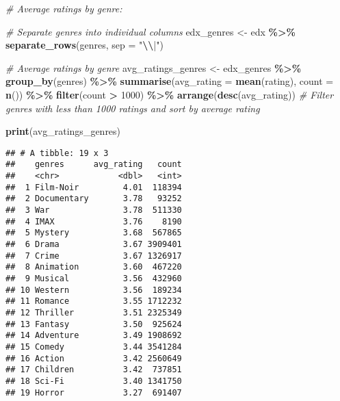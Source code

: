 \documentclass[
]{article}
\newenvironment{Shaded}{\begin{snugshade}}{\end{snugshade}}
\newcommand{\AttributeTok}[1]{\textcolor[rgb]{0.13,0.29,0.53}{#1}}
\newcommand{\CommentTok}[1]{\textcolor[rgb]{0.56,0.35,0.01}{\textit{#1}}}
\newcommand{\DecValTok}[1]{\textcolor[rgb]{0.00,0.00,0.81}{#1}}
\newcommand{\FunctionTok}[1]{\textcolor[rgb]{0.13,0.29,0.53}{\textbf{#1}}}
\newcommand{\NormalTok}[1]{#1}
\newcommand{\OtherTok}[1]{\textcolor[rgb]{0.56,0.35,0.01}{#1}}
\newcommand{\SpecialCharTok}[1]{\textcolor[rgb]{0.81,0.36,0.00}{\textbf{#1}}}
\newcommand{\StringTok}[1]{\textcolor[rgb]{0.31,0.60,0.02}{#1}}
\begin{document}
\begin{Shaded}
\begin{Highlighting}[]
\CommentTok{\# Average ratings by genre:}


\CommentTok{\# Separate genres into individual columns}
\NormalTok{edx\_genres }\OtherTok{\textless{}{-}}\NormalTok{ edx }\SpecialCharTok{\%\textgreater{}\%} \FunctionTok{separate\_rows}\NormalTok{(genres, }\AttributeTok{sep =} \StringTok{"}\SpecialCharTok{\textbackslash{}\textbackslash{}}\StringTok{|"}\NormalTok{)}

\CommentTok{\# Average ratings by genre}
\NormalTok{avg\_ratings\_genres }\OtherTok{\textless{}{-}}\NormalTok{ edx\_genres }\SpecialCharTok{\%\textgreater{}\%}
  \FunctionTok{group\_by}\NormalTok{(genres) }\SpecialCharTok{\%\textgreater{}\%}
  \FunctionTok{summarise}\NormalTok{(}\AttributeTok{avg\_rating =} \FunctionTok{mean}\NormalTok{(rating), }\AttributeTok{count =} \FunctionTok{n}\NormalTok{()) }\SpecialCharTok{\%\textgreater{}\%}
  \FunctionTok{filter}\NormalTok{(count }\SpecialCharTok{\textgreater{}} \DecValTok{1000}\NormalTok{) }\SpecialCharTok{\%\textgreater{}\%}
  \FunctionTok{arrange}\NormalTok{(}\FunctionTok{desc}\NormalTok{(avg\_rating)) }\CommentTok{\# Filter genres with less than 1000 ratings and sort by average rating}

\FunctionTok{print}\NormalTok{(avg\_ratings\_genres)}
\end{Highlighting}
\end{Shaded}

\begin{verbatim}
## # A tibble: 19 x 3
##    genres      avg_rating   count
##    <chr>            <dbl>   <int>
##  1 Film-Noir         4.01  118394
##  2 Documentary       3.78   93252
##  3 War               3.78  511330
##  4 IMAX              3.76    8190
##  5 Mystery           3.68  567865
##  6 Drama             3.67 3909401
##  7 Crime             3.67 1326917
##  8 Animation         3.60  467220
##  9 Musical           3.56  432960
## 10 Western           3.56  189234
## 11 Romance           3.55 1712232
## 12 Thriller          3.51 2325349
## 13 Fantasy           3.50  925624
## 14 Adventure         3.49 1908692
## 15 Comedy            3.44 3541284
## 16 Action            3.42 2560649
## 17 Children          3.42  737851
## 18 Sci-Fi            3.40 1341750
## 19 Horror            3.27  691407
\end{verbatim}
\end{document}
